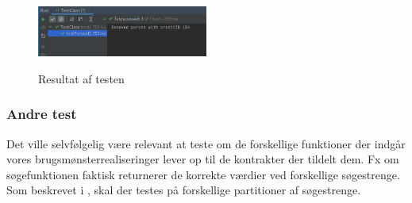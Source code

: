 \begin{figure}
    \centering
    \includegraphics[width=0.5\textwidth]{images/test.png}
    \label{fig:test}
    \caption{Resultat af testen}
\end{figure}

\subsubsection{Andre test}%
\label{ssub:andre_test}

Det ville selvfølgelig være relevant at teste om de forskellige funktioner der
indgår vores brugsmønsterrealiseringer lever op til de kontrakter der tildelt
dem. Fx om søgefunktionen faktisk returnerer de korrekte værdier ved forskellige
søgestrenge. Som beskrevet i \cite[s.
236]{book:sommeville_software_engineering}, skal der testes på forskellige
partitioner af søgestrenge. 
